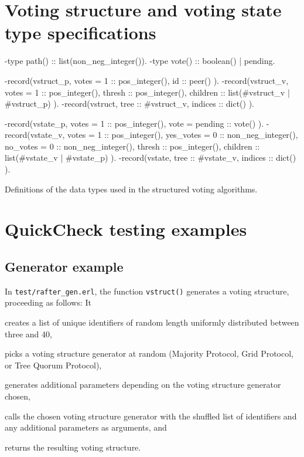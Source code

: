 \documentclass[12pt,chapterprefix=true,toc=bibliography,numbers=noendperiod,
               footnotes=multiple,twoside]{scrreprt}
\begin{document}
\newpage

\section{Voting structure and voting state type specifications}
\label{sc:voting-types}

\begin{listing}[H]
    \begin{erlangcode}
-type path() :: list(non_neg_integer()).
-type vote() :: boolean() | pending.

-record(vstruct_p, {
          votes = 1 :: pos_integer(),
          id :: peer()
}).
-record(vstruct_v, {
          votes = 1 :: pos_integer(),
          thresh :: pos_integer(),
          children :: list(#vstruct_v{} | #vstruct_p{})
}).
-record(vstruct, {
          tree :: #vstruct_v{},
          indices :: dict()
}).

-record(vstate_p, {
          votes = 1 :: pos_integer(),
          vote = pending :: vote()
}).
-record(vstate_v, {
          votes = 1 :: pos_integer(),
          yes_votes = 0 :: non_neg_integer(),
          no_votes = 0 :: non_neg_integer(),
          thresh :: pos_integer(),
          children :: list(#vstate_v{} | #vstate_p{})
}).
-record(vstate, {
          tree :: #vstate_v{},
          indices :: dict()
}).
    \end{erlangcode}
    \caption{Definitions of the data types used in the structured voting algorithms.}
    \label{lst:voting-types}
\end{listing}

\section{QuickCheck testing examples}
\label{sc:testing-examples}

\subsection{Generator example}
\label{ssc:generator}

In \texttt{test/rafter\_gen.erl}, the function \texttt{vstruct()} generates a voting structure, proceeding as follows: It
\begin{inparaenum}[(a)]
    \item creates a list of unique identifiers of random length uniformly distributed between three and 40,
    \item picks a voting structure generator at random (Majority Protocol, Grid Protocol, or Tree Quorum Protocol),
    \item generates additional parameters depending on the voting structure generator chosen,
    \item calls the chosen voting structure generator with the shuffled list of identifiers and any additional parameters as arguments, and
    \item returns the resulting voting structure.
\end{inparaenum}
\end{document}
